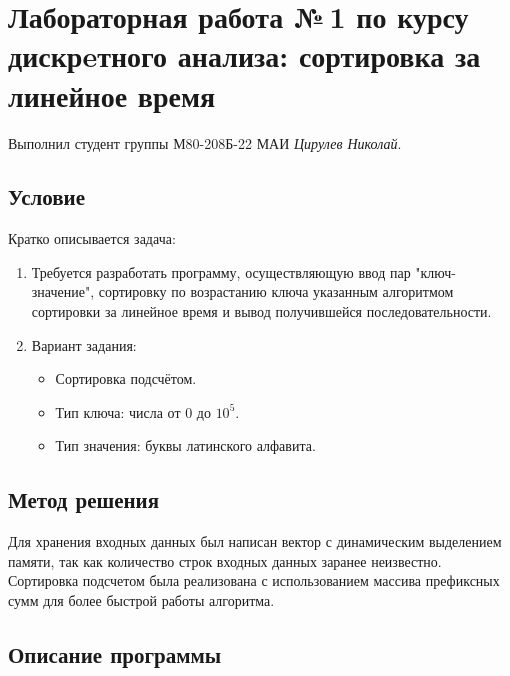 \documentclass[12pt]{article}
\begin{document}
\section*{Лабораторная работа №\,1 по курсу дискрeтного анализа: сортировка за линейное время}

Выполнил студент группы М80-208Б-22 МАИ \textit{Цирулев Николай}.

\subsection*{Условие}

Кратко описывается задача:
\begin{enumerate}
\item
    Требуется разработать программу, осуществляющую ввод пар "ключ-значение", сортировку по возрастанию ключа указанным алгоритмом сортировки за линейное время и вывод получившейся последовательности.
\item
    Вариант задания:
        \begin{itemize}
            \item Сортировка подсчётом.
            \item Тип ключа: числа от 0 до $10^{5}$.
            \item Тип значения: буквы латинского алфавита.
        \end{itemize}
\end{enumerate}

\subsection*{Метод решения}

Для хранения входных данных был написан вектор с динамическим выделением памяти, так как количество строк входных данных заранее неизвестно. Сортировка подсчетом была реализована с использованием массива префиксных сумм для более быстрой работы алгоритма.

\subsection*{Описание программы}
\end{document}
